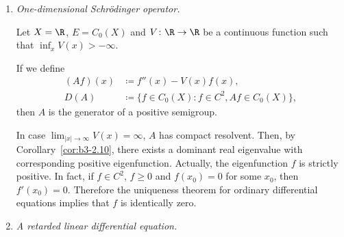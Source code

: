 \begin{example}\label{ex:b3-2.14}
%

\begin{enumerate}[\upshape (i), wide, labelindent=.25em]
	\item \emph{One-dimensional Schrödinger operator.}

	Let $X = \R$, $E = C_{0}(X)$ and $V \colon \R \to \R$ be a continuous function such that $\inf_{x} V(x) > -\infty$.
	
	If we define
	\begin{equation}\label{eq:b3-2.22}
		\begin{aligned}
			(Af)(x) &\coloneqq f''(x) - V(x)f(x), \\
			D(A) &\coloneqq \{f \in C_{0}(X) \colon f \in C^{2}, Af \in C_{0}(X)\},
		\end{aligned}
	\end{equation}
	then $A$ is the generator of a positive semigroup.
	
	In case $\lim_{|x| \to \infty}V(x) = \infty$, $A$ has compact resolvent.
	Then, by Corollary~\ref{cor:b3-2.10}, there exists a dominant real eigenvalue with corresponding positive eigenfunction.
	Actually, the eigenfunction $f$ is strictly positive. 
    In fact, if\/ $f \in C^{2}$, $f \geq 0$ and $f(x_{0}) = 0$ for some $x_{0}$, then $f'(x_{0}) = 0$.
	Therefore the uniqueness theorem for ordinary differential equations implies that $f$ is identically zero.
	
\item \emph{A retarded linear differential equation.}


\end{enumerate}
\end{example}
